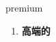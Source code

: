 
\begin{frame}
{\huge premium}
\begin{center}
\begin{enumerate}\Large
  \item \textbf{高端的}
\end{enumerate}
\end{center}
\end{frame}
